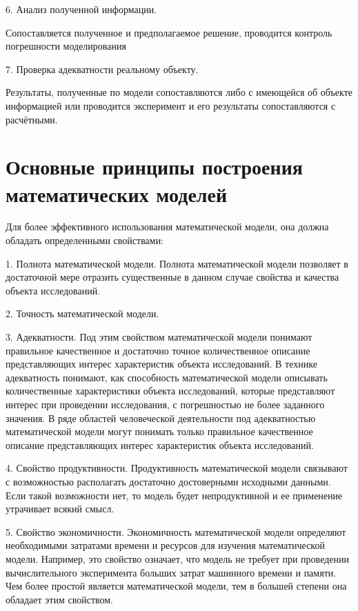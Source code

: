 6. Анализ полученной информации. 


Сопоставляется полученное и предполагаемое решение, проводится контроль погрешности моделирования


7. Проверка адекватности реальному объекту.


Результаты, полученные по модели сопоставляются либо с имеющейся об объекте информацией или проводится эксперимент и его результаты сопоставляются с расчётными.


\section{Основные принципы построения математических моделей}


Для более эффективного использования математической модели, она должна обладать определенными свойствами:


1. Полнота математической модели. Полнота математической модели позволяет в достаточной мере отразить существенные в данном случае свойства и качества объекта исследований. 


2. Точность математической модели.  


3. Адекватности. Под этим свойством математической модели понимают правильное качественное и достаточно точное количественное описание представляющих интерес характеристик объекта исследований. В технике адекватность понимают, как способность математической модели описывать количественные характеристики объекта исследований, которые представляют интерес при проведении исследования, с погрешностью не более заданного значения.
В ряде областей человеческой деятельности под адекватностью математической модели могут понимать только правильное качественное описание представляющих интерес характеристик объекта исследований.


4. Свойство продуктивности. Продуктивность математической модели связывают с возможностью располагать достаточно достоверными исходными данными. Если такой возможности нет, то модель будет непродуктивной и ее применение утрачивает всякий смысл.


5. Свойство экономичности. Экономичность математической модели определяют необходимыми затратами времени и ресурсов для изучения математической модели. Например, это свойство означает, что модель не требует при проведении вычислительного эксперимента больших затрат машинного времени и памяти. Чем более простой является математической модели, тем в большей степени она обладает этим свойством.


